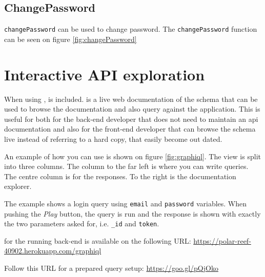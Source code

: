 \subsection{ChangePassword}
\label{sec:changePassword}
\verb+changePassword+ can be used to change password.
The \verb+changePassword+ function can be seen on figure \ref{fig:changePassword}

\section{Interactive API exploration}
When using ,  is included.
 is a live web documentation of the schema that can be used to browse the documentation and also query against the application.
This is useful for both for the back-end developer that does not need to maintain an \gls{api} documentation and also for the front-end developer that can browse the schema live instead of referring to a hard copy, that easily become out dated.

An example of how you can use  is shown on figure \ref{fig:graphiql}.
The view is split into three columns.
The column to the far left is where you can write queries.
The centre column is for the  responses.
To the right is the documentation explorer.

The example shows a login query using \verb+email+ and \verb+password+ variables.
When pushing the \textit{Play} button, the query is run and the response is shown with exactly the two parameters asked for, i.e. \verb+_id+ and \verb+token+.

 for the running back-end is available on the following URL: \newline
\url{https://polar-reef-40902.herokuapp.com/graphiql}

Follow this URL for a prepared query setup: \newline
\url{https://goo.gl/pQjOko}

